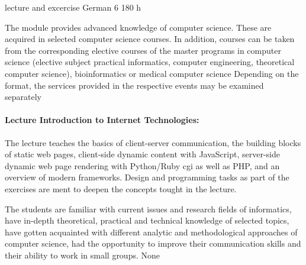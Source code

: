 {lecture and excercise}
{German}
{6}
{180 h}
{The module provides advanced knowledge of computer science. These are acquired in selected computer science courses. In addition, courses can be taken from the corresponding elective courses of the master programs in computer science (elective subject practical informatics, computer engineering, theoretical computer science), bioinformatics or medical computer science Depending on the format, the services provided in the respective events may be examined separately
\paragraph{Lecture Introduction to Internet Technologies:} The lecture teaches the basics of client-server communication, the building blocks of static web pages, client-side dynamic content with JavaScript, server-side dynamic web page rendering with Python/Ruby cgi as well as PHP, and an overview of modern frameworks. Design and programming tasks as part of the exercises are ment to deepen the concepts tought in the lecture.}
{The students are familiar with current issues and research fields of informatics, have in-depth theoretical, practical and technical knowledge of selected topics, have gotten acquainted with different analytic and methodological approaches of computer science, had the opportunity to improve their communication skills and their ability to work in small groups.
}
{None}